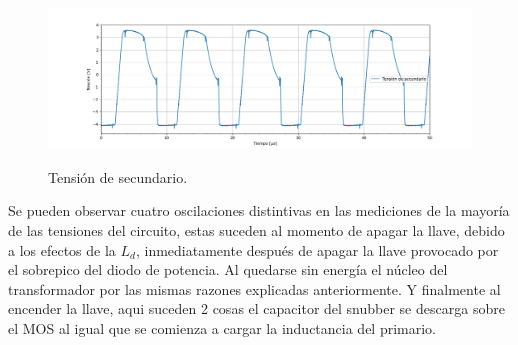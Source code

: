 \begin{figure}[H]
	\centering
	\includegraphics[width=0.9\linewidth]{ImagenesParteIV/Vsec.png}
	\label{fig:vsec_4}
	\caption{Tensión de secundario.}
\end{figure}
Se pueden observar cuatro oscilaciones distintivas en las mediciones de la mayoría de las tensiones del circuito, estas suceden al momento de apagar la llave, debido a los efectos de la $L_d$, inmediatamente después de apagar la llave provocado por el sobrepico del diodo de potencia. Al quedarse sin energía el núcleo del transformador por las mismas razones explicadas anteriormente. Y finalmente al encender la llave, aqui suceden 2 cosas el capacitor del snubber se descarga sobre el MOS al igual que se comienza a cargar la inductancia del primario.
%